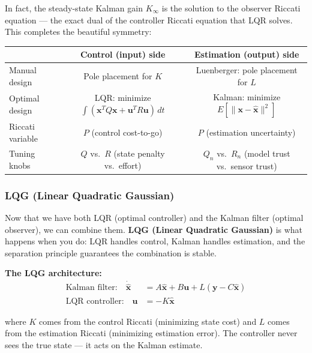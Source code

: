 In fact, the steady-state Kalman gain $K_\infty$ is the solution to the observer Riccati equation --- the exact dual of the controller Riccati equation that LQR solves. This completes the beautiful symmetry:

\begin{center}
\begin{tabular}{lcc}
\toprule
 & \textbf{Control (input) side} & \textbf{Estimation (output) side} \\
\midrule
Manual design & Pole placement for $K$ & Luenberger: pole placement for $L$ \\
Optimal design & LQR: minimize $\int (\mathbf{x}^TQ\mathbf{x} + \mathbf{u}^TR\mathbf{u})\,dt$ & Kalman: minimize $E[\|\mathbf{x} - \hat{\mathbf{x}}\|^2]$ \\
Riccati variable & $P$ (control cost-to-go) & $P$ (estimation uncertainty) \\
Tuning knobs & $Q$ vs.\ $R$ (state penalty vs.\ effort) & $Q_n$ vs.\ $R_n$ (model trust vs.\ sensor trust) \\
\bottomrule
\end{tabular}
\end{center}

\subsubsection{LQG (Linear Quadratic Gaussian)}

Now that we have both LQR (optimal controller) and the Kalman filter (optimal observer), we can combine them. \textbf{LQG (Linear Quadratic Gaussian)} is what happens when you do: LQR handles control, Kalman handles estimation, and the separation principle guarantees the combination is stable.

\textbf{The LQG architecture:}
\begin{align}
\text{Kalman filter:} \quad \dot{\hat{\mathbf{x}}} &= A\hat{\mathbf{x}} + B\mathbf{u} + L(\mathbf{y} - C\hat{\mathbf{x}}) \\
\text{LQR controller:} \quad \mathbf{u} &= -K\hat{\mathbf{x}}
\end{align}

where $K$ comes from the control Riccati (minimizing state cost) and $L$ comes from the estimation Riccati (minimizing estimation error). The controller never sees the true state --- it acts on the Kalman estimate.

